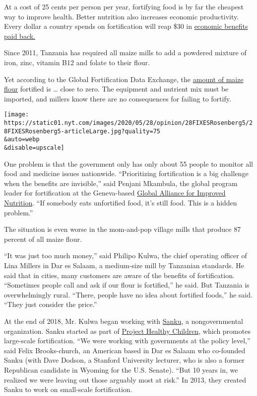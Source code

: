At a cost of 25 cents per person per year, fortifying food is by far the
cheapest way to improve health. Better nutrition also increases economic
productivity. Every dollar a country spends on fortification will reap
\$30 in
\href{https://www.copenhagenconsensus.com/publication/third-copenhagen-consensus-hunger-and-malnutrition-assessment-hoddinott-rosegrant-torero}{economic
benefits paid back.}

Since 2011, Tanzania has required all maize mills to add a powdered
mixture of iron, zinc, vitamin B12 and folate to their flour.

Yet according to the Global Fortification Data Exchange, the
\href{https://fortificationdata.org/country-fortification-dashboard/?alpha3_code=TZA\&lang=en}{amount
of maize flour} fortified is \ldots{} close to zero. The equipment and
nutrient mix must be imported, and millers know there are no
consequences for failing to fortify.

\texttt{[image: https://static01.nyt.com/images/2020/05/28/opinion/28FIXESRosenberg5/28FIXESRosenberg5-articleLarge.jpg?quality=75\\\&auto=webp\\\&disable=upscale]}

One problem is that the government only has only about 55 people to
monitor all food and medicine issues nationwide. ``Prioritizing
fortification is a big challenge when the benefits are invisible,'' said
Penjani Mkambula, the global program leader for fortification at the
Geneva-based \href{http://www.gainhealth.org/}{Global Alliance for
Improved Nutrition}. ``If somebody eats unfortified food, it's still
food. This is a hidden problem.''

The situation is even worse in the mom-and-pop village mills that
produce 87 percent of all maize flour.

``It was just too much money,'' said Philipo Kulwa, the chief operating
officer of Lina Millers in Dar es Salaam, a medium-size mill by
Tanzanian standards. He said that in cities, many customers are aware of
the benefits of fortification. ``Sometimes people call and ask if our
flour is fortified,'' he said. But Tanzania is overwhelmingly rural.
``There, people have no idea about fortified foods,'' he said. ``They
just consider the price.''

At the end of 2018, Mr. Kulwa began working with
\href{http://projecthealthychildren.com/small-scale-fortification/}{Sanku},
a nongovernmental organization. Sanku started as part of
\href{http://www.projecthealthychildren.org/}{Project Healthy Children},
which promotes large-scale fortification. ``We were working with
governments at the policy level,'' said Felix Brooks-church, an American
based in Dar es Salaam who co-founded Sanku (with Dave Dodson, a
Stanford University lecturer, who is also a former Republican candidate
in Wyoming for the U.S. Senate). ``But 10 years in, we realized we were
leaving out those arguably most at risk.'' In 2013, they created Sanku
to work on small-scale fortification.

